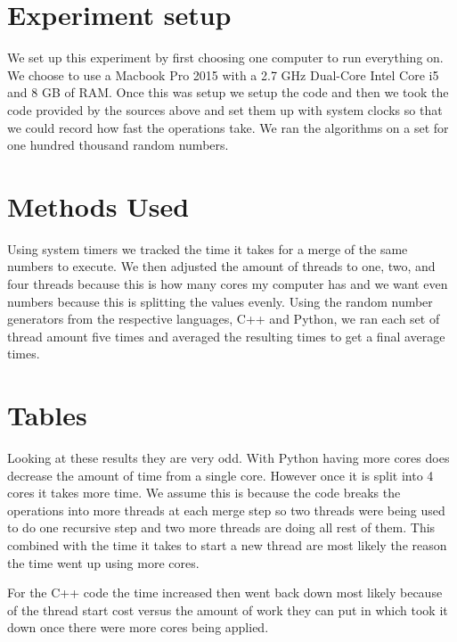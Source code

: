 \documentclass{article}
\begin{document}
\section{Experiment setup}

We set up this experiment by first choosing one computer to run everything on. We choose to use a Macbook Pro 2015 with a 2.7 GHz Dual-Core Intel Core i5 and 8 GB of RAM. Once this was setup we setup the code and then we took the code provided by the sources above and set them up with system clocks so that we could record how fast the operations take. We ran the algorithms on a set for one hundred thousand random numbers.

\section{Methods Used}

Using system timers we tracked the time it takes for a merge of the same numbers to execute. We then adjusted the amount of threads to one, two, and four threads because this is how many cores my computer has and we want even numbers because this is splitting the values evenly. Using the random number generators from the respective languages, C++ and Python, we ran each set of thread amount five times and averaged the resulting times to get a final average times. 

\section{Tables}


Looking at these results they are very odd. With Python having more cores does decrease the amount of time from a single core. However once it is split into 4 cores it takes more time. We assume this is because the code breaks the operations into more threads at each merge step so two threads were being used to do one recursive step and two more threads are doing all rest of them. This combined with the time it takes to start a new thread are most likely the reason the time went up using more cores. \newline

For the C++ code the time increased then went back down most likely because of the thread start cost versus the amount of work they can put in which took it down once there were more cores being applied. 
\end{document}

